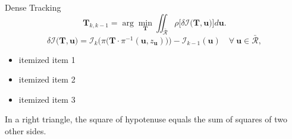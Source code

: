 \documentclass[10pt]{beamer}
\newcommand{\T}{\mathbf{T}}
\newcommand{\bu}{\mathbf{u}}
\newcommand{\I}{\mathcal{I}}
\begin{document}
\begin{frame}{Dense Tracking}
\[
  \T_{k,k-1} = \arg\min_\T \iint_{\bar{\mathcal{R}}} \rho\Big[ \delta \I\big(\T, \bu\big) \Big] d\bu.
\]
\[
  \delta \I\big(\T, \bu\big)
   = \I_k\Big(\pi\big(\T \cdot \pi^{-1}(\bu, z_\bu)\big)\Big) - \I_{k-1}(\bu) 
   \quad \forall \ \bu \in \bar{\mathcal{R}},
\]

\begin{itemize}
  \item itemized item 1
  \item itemized item 2
  \item itemized item 3
\end{itemize}

\begin{theorem}
  In a right triangle, the square of hypotenuse equals
  the sum of squares of two other sides.
\end{theorem}

\end{frame}
\end{document}
